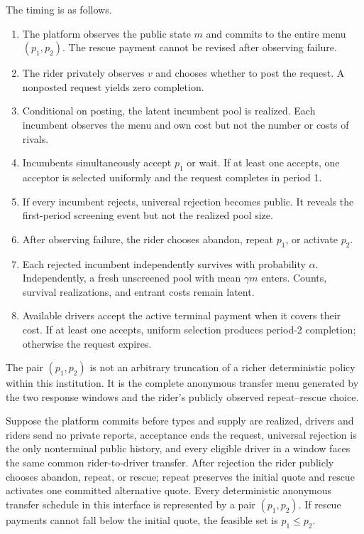 \documentclass[mnsc,blindrev]{informs3}
\begin{document}
The timing is as follows.
\begin{enumerate}[label=\textit{Stage \arabic*.},leftmargin=17mm,itemsep=2pt]
\item The platform observes the public state $m$ and commits to the entire
menu $(p_1,p_2)$.  The rescue payment cannot be revised after observing
failure.
\item The rider privately observes $v$ and chooses whether to post the
request.  A nonposted request yields zero completion.
\item Conditional on posting, the latent incumbent pool is realized.  Each
incumbent observes the menu and own cost but not the number or costs of rivals.
\item Incumbents simultaneously accept $p_1$ or wait.  If at least one accepts,
one acceptor is selected uniformly and the request completes in period 1.
\item If every incumbent rejects, universal rejection becomes public.  It
reveals the first-period screening event but not the realized pool size.
\item After observing failure, the rider chooses abandon, repeat $p_1$, or
activate $p_2$.
\item Each rejected incumbent independently survives with probability
$\alpha$.  Independently, a fresh unscreened pool with mean $\gamma m$ enters.
Counts, survival realizations, and entrant costs remain latent.
\item Available drivers accept the active terminal payment when it covers
their cost.  If at least one accepts, uniform selection produces period-2
completion; otherwise the request expires.
\end{enumerate}

The pair $(p_1,p_2)$ is not an arbitrary truncation of a richer deterministic
policy within this institution.  It is the complete anonymous transfer menu
generated by the two response windows and the rider's publicly observed
repeat--rescue choice.

\begin{proposition}
\label{prop:representation}
Suppose the platform commits before types and supply are realized, drivers and
riders send no private reports, acceptance ends the request, universal
rejection is the only nonterminal public history, and every eligible driver in
a window faces the same common rider-to-driver transfer.  After rejection the
rider publicly chooses abandon, repeat, or rescue; repeat preserves the
initial quote and rescue activates one committed alternative quote.  Every
deterministic anonymous transfer schedule in this interface is represented by
a pair $(p_1,p_2)$.  If rescue payments cannot fall below the initial quote,
the feasible set is $p_1\le p_2$.
\end{proposition}
\end{document}
